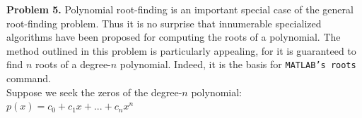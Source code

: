\documentclass[14pt,a4paper]{article}
\begin{document}
	


\label{Problem 5}
\large\textbf{Problem 5.} Polynomial root-finding is an important special case of the general root-finding problem. Thus it is no surprise that innumerable specialized algorithms have been proposed for computing the roots of a polynomial. The method outlined in this problem is particularly appealing, for it is guaranteed to find $n$ roots of a degree-$n$ polynomial. Indeed, it is the basis for \texttt{MATLAB’s roots} command.\\
Suppose we seek the zeros of the degree-$n$ polynomial: $p(x) = c_0 + c_1x + ... + c_nx^n$
\end{document}
